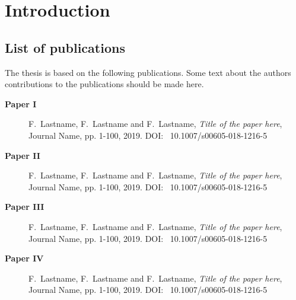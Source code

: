 \chapter{Introduction}

\blindmathtrue
\Blindtext

\section{List of publications}

The thesis is based on the following publications. Some text about the authors contributions to the publications should be made here.

\begin{description}
\item[\textbf{Paper I}] F.~Lastname, F.~Lastname and F.~Lastname, \emph{Title of the paper here}, Journal Name, pp. 1-100, 2019. DOI:~ 10.1007/s00605-018-1216-5
\item[\textbf{Paper II}] F.~Lastname, F.~Lastname and F.~Lastname, \emph{Title of the paper here}, Journal Name, pp. 1-100, 2019. DOI:~ 10.1007/s00605-018-1216-5
\item[\textbf{Paper III}] F.~Lastname, F.~Lastname and F.~Lastname, \emph{Title of the paper here}, Journal Name, pp. 1-100, 2019. DOI:~ 10.1007/s00605-018-1216-5
\item[\textbf{Paper IV}] F.~Lastname, F.~Lastname and F.~Lastname, \emph{Title of the paper here}, Journal Name, pp. 1-100, 2019. DOI:~ 10.1007/s00605-018-1216-5
\end{description}



